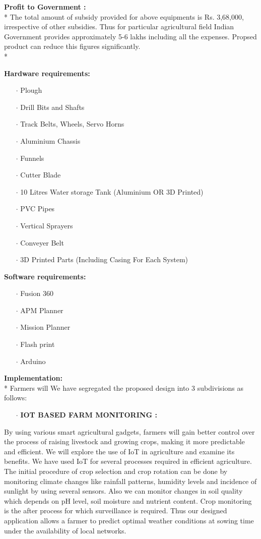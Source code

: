 \documentclass[12pt]{article}
\begin{document}
\textbf{Profit to Government :} \\*
The total amount of subsidy provided for above equipments is Rs. 3,68,000, irrespective of other subsidies. Thus for particular agricultural field Indian Government provides approximately 5-6 lakhs including all the expenses. Propsed product can reduce this figures significantly. \\*


\textbf{Hardware requirements:}
\begin{itemize}
\item[$\cdot$] Plough
\item[$\cdot$] Drill Bits and Shafts
\item[$\cdot$] Track Belts, Wheels, Servo Horns
\item[$\cdot$] Aluminium Chassis
\item[$\cdot$] Funnels
\item[$\cdot$] Cutter Blade
\item[$\cdot$] 10 Litres Water storage Tank (Aluminium OR 3D Printed)
\item[$\cdot$] PVC Pipes
\item[$\cdot$] Vertical Sprayers
\item[$\cdot$] Conveyer Belt
\item[$\cdot$] 3D Printed Parts (Including Casing For Each System)
\end{itemize}

\textbf{Software requirements:}
\begin{itemize}
\item[$\cdot$] Fusion 360
\item[$\cdot$] APM Planner
\item[$\cdot$] Mission Planner
\item[$\cdot$] Flash print
\item[$\cdot$] Arduino
\end{itemize}

\textbf{Implementation:} \\*
Farmers will 
We have segregated the proposed design into 3 subdivisions as follows:
\begin{itemize}
\item[$\cdot$] \textbf{IOT BASED FARM MONITORING :} 
\end{itemize}
By using various smart agricultural gadgets, farmers will gain better control over the process of raising livestock and growing crops, making it more predictable and efficient. We will explore the use of IoT in agriculture and examine its benefits. We have used IoT for several processes required in efficient agriculture. The initial procedure of crop selection and crop rotation can be done by monitoring climate changes like rainfall patterns, humidity levels and incidence of sunlight by using several sensors. Also we can monitor changes in soil quality which depends on pH level, soil moisture and nutrient content. Crop monitoring is the after process for which surveillance is required. Thus our designed application allows a farmer to predict optimal weather conditions at sowing time under the availability of local networks.     
\end{document}
